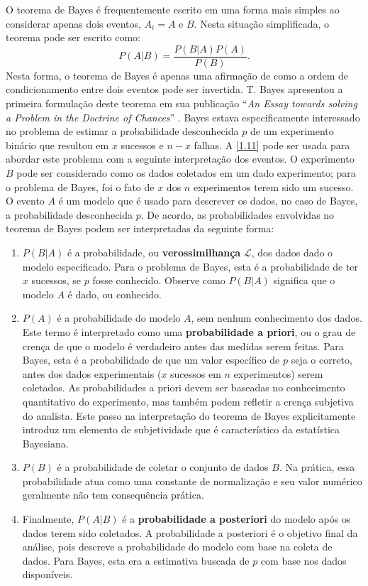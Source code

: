 O teorema de Bayes é frequentemente escrito em uma forma mais simples ao considerar apenas dois eventos, $A_i = A$ e $B$. Nesta situação simplificada, o teorema pode ser escrito como:
\begin{equation}\label{1.11}
P(A | B) = \dfrac{P(B | A)P(A)}{P(B)}.
\end{equation}
Nesta forma, o teorema de Bayes é apenas uma afirmação de como a ordem de condicionamento entre dois eventos pode ser invertida. T. Bayes apresentou a primeira formulação deste teorema em sua publicação ``\textit{An Essay towards solving a Problem in the Doctrine of Chances}'' \citep{bayes1763lii}. Bayes estava especificamente interessado no problema de estimar a probabilidade desconhecida $p$ de um experimento binário que resultou em $x$ sucessos e $n - x$ falhas. A \autoref{1.11} pode ser usada para abordar este problema com a seguinte interpretação dos eventos. O experimento $B$ pode ser considerado como os dados coletados em um dado experimento; para o problema de Bayes, foi o fato de $x$ dos $n$ experimentos terem sido um sucesso. O evento $A$ é um modelo que é usado para descrever os dados, no caso de Bayes, a probabilidade desconhecida $p$. De acordo, as probabilidades envolvidas no teorema de Bayes podem ser interpretadas da seguinte forma:
\begin{enumerate}[noitemsep]
\item $P(B | A)$ é a probabilidade, ou \textbf{verossimilhança} $\mathcal{L}$, dos dados dado o modelo especificado. Para o problema de Bayes, esta é a probabilidade de ter $x$ sucessos, se $p$ fosse conhecido. Observe como $P(B | A)$ significa que o modelo $A$ é dado, ou conhecido.

\item $P(A)$ é a probabilidade do modelo $A$, sem nenhum conhecimento dos dados. Este termo é interpretado como uma \textbf{probabilidade a priori}, ou o grau de crença de que o modelo é verdadeiro antes das medidas serem feitas. Para Bayes, esta é a probabilidade de que um valor específico de $p$ seja o correto, antes dos dados experimentais ($x$ sucessos em $n$ experimentos) serem coletados. As probabilidades a priori devem ser baseadas no conhecimento quantitativo do experimento, mas também podem refletir a crença subjetiva do analista. Este passo na interpretação do teorema de Bayes explicitamente introduz um elemento de subjetividade que é característico da estatística Bayesiana.

\item $P(B)$ é a probabilidade de coletar o conjunto de dados $B$. Na prática, essa probabilidade atua como uma constante de normalização e seu valor numérico geralmente não tem consequência prática.

\item Finalmente, $P(A | B)$ é a \textbf{probabilidade a posteriori} do modelo após os dados terem sido coletados. A probabilidade a posteriori é o objetivo final da análise, pois descreve a probabilidade do modelo com base na coleta de dados. Para Bayes, esta era a estimativa buscada de $p$ com base nos dados disponíveis.
\end{enumerate}

